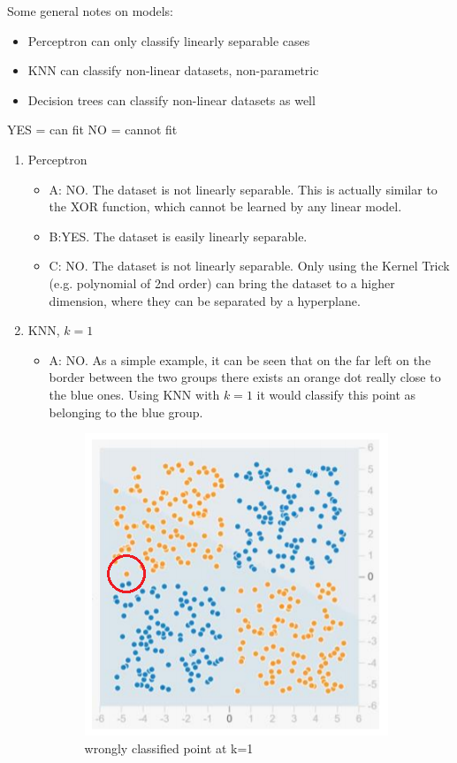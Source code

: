 \documentclass[a4paper]{iacas}
\begin{document}
Some general notes on models:
\begin{itemize}
  \item Perceptron can only classify linearly separable cases
  \item KNN can classify non-linear datasets, non-parametric
  \item Decision trees can classify non-linear datasets as well
\end{itemize}


YES = can fit
NO = cannot fit


\begin{enumerate}
  \item Perceptron

\begin{itemize}
  \item A: NO. The dataset is not linearly separable. This is actually similar to the XOR function, which cannot be learned by any linear model.
  \item B:YES. The dataset is easily linearly separable.
  \item C: NO. The dataset is not linearly separable. Only using the Kernel Trick (e.g. polynomial of 2nd order) can bring the dataset to a higher dimension, where they can be separated by a hyperplane.
\end{itemize}

  \item KNN, $k=1$

\begin{itemize}
  \item A: NO. As a simple example, it can be seen that on the far left on the border between the two groups there exists an orange dot really close to the blue ones. Using KNN with $k=1$ it would classify this point as belonging to the blue group.

\begin{figure}[h!]
  \centering
  \includegraphics[width=0.4\linewidth]{q2_1.png}
  \caption{wrongly classified point at k=1}
  \label{fig:q2_1}
\end{figure}


\end{itemize}
\end{enumerate}
\end{document}
